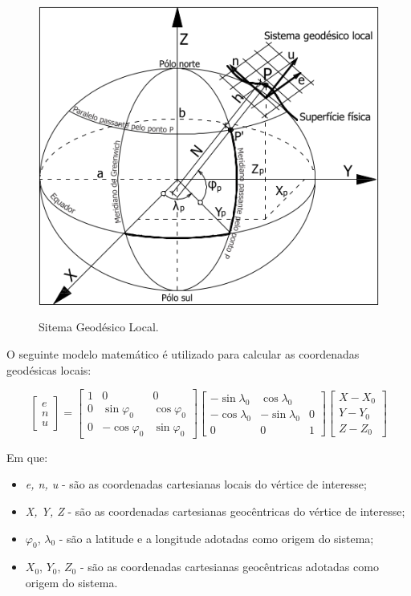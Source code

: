 \begin{figure}[H]
\centering
\includegraphics[scale=0.7]{img/sgl.png} %
\caption{Sitema Geodésico Local.} \citep{ibge_imoveis}
\label{Rotulo}
\end{figure}

O seguinte modelo matemático é utilizado para calcular as coordenadas geodésicas locais:

\small
\begin{equation}
\label{sgl_mod_mat}
\begin{bmatrix}
e\\
n\\
u
\end{bmatrix}
=
\begin{bmatrix}
1 & 0 & 0\\
0 & \sin{\varphi_0} & \cos{\varphi_0}\\
0 & -\cos{\varphi_0} & \sin{\varphi_0}
\end{bmatrix}
\begin{bmatrix}
-\sin{\lambda_0} & \cos{\lambda_0}\\
-\cos{\lambda_0} & -\sin{\lambda_0} & 0\\
0 & 0 & 1
\end{bmatrix}
\begin{bmatrix}
X-X_0\\
Y-Y_0\\
Z-Z_0
\end{bmatrix}
\end{equation}
\normalsize

Em que:
\begin{itemize}
    \item \textit{e, n, u} - são as coordenadas cartesianas locais do vértice de interesse;
    \item \textit{X, Y, Z} - são as coordenadas cartesianas geocêntricas do vértice de interesse;
    \item $\varphi_0$, $\lambda_0$ - são a latitude e a longitude adotadas como origem do sistema;
    \item $X_0$, $Y_0$, $Z_0$ - são as coordenadas cartesianas geocêntricas adotadas como origem do sistema.
\end{itemize}